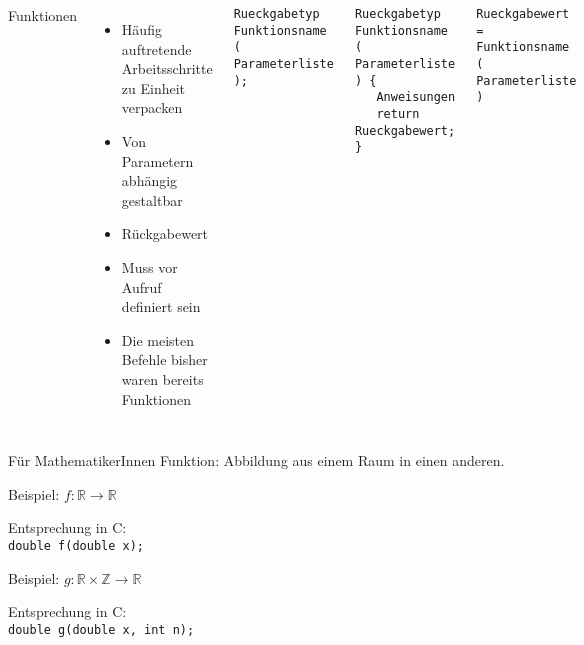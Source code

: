 \begin{frame}[fragile]
%
\begin{columns}[T]
\begin{Large}
Funktionen
\vspace{10pt}
\end{Large}
%
\begin{itemize}
\item Häufig auftretende Arbeitsschritte zu Einheit verpacken
\item Von Parametern abhängig gestaltbar
\item Rückgabewert
\item Muss vor Aufruf definiert sein
\item Die meisten Befehle bisher waren bereits Funktionen
\end{itemize}
%
\begin{codebox}
\begin{verbatim}
Rueckgabetyp Funktionsname ( Parameterliste );
\end{verbatim}
\end{codebox}
%
\begin{codebox}
\begin{verbatim}
Rueckgabetyp Funktionsname ( Parameterliste ) {
   Anweisungen
   return Rueckgabewert;
}
\end{verbatim}
\end{codebox}
%
\begin{codebox}
\begin{verbatim}
Rueckgabewert = Funktionsname ( Parameterliste )
\end{verbatim}
\end{codebox}
\end{columns}
%
\end{frame}


\begin{frame}{Für MathematikerInnen}
%
Funktion: Abbildung aus einem Raum in einen anderen.
\begin{center}

\end{center}
\begin{minipage}{.49\linewidth}
Beispiel: $f: \mathbb{R} \to \mathbb{R}$

Entsprechung in C:\\
\texttt{double f(double x);}
\end{minipage}
%
\begin{minipage}{.49\linewidth}
Beispiel: $g: \mathbb{R} \times \mathbb{Z} \to \mathbb{R}$

Entsprechung in C:\\
\texttt{double g(double x, int n);}
\end{minipage}
%
\end{frame}

